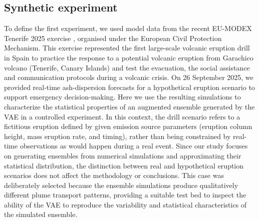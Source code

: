 \subsection{Synthetic experiment} \label{sec:synthetic-experiment}
To define the first experiment, we used model data from the recent EU-MODEX Tenerife 2025 exercise \citep{european_commission2025}, organised under the European Civil Protection Mechanism. This exercise represented the first large-scale volcanic eruption drill in Spain to practice the response to a potential volcanic eruption from Garachico volcano (Tenerife, Canary Islands) and test the evacuation, the social assistance and communication protocols during a volcanic crisis. On 26 September 2025, we provided real-time ash-dispersion forecasts for a hypothetical eruption scenario to support emergency decision-making. Here we use the resulting simulations to characterize the statistical properties of an augmented ensemble generated by the VAE in a controlled experiment. In this context, the drill scenario refers to a fictitious eruption defined by given emission source parameters (eruption column height, mass eruption rate, and timing), rather than being constrained by real-time observations as would happen during a real event. Since our study focuses on generating ensembles from numerical simulations and approximating their statistical distribution, the distinction between real and hypothetical eruption scenarios does not affect the methodology or conclusions. This case was deliberately selected because the ensemble simulations produce qualitatively different plume transport patterns, providing a suitable test bed to inspect the ability of the VAE to reproduce the variability and statistical characteristics of the simulated ensemble.

